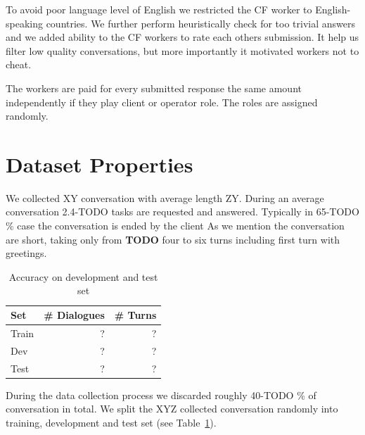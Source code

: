 \documentclass[runningheads,a4paper]{llncs}
\begin{document}
To avoid poor language level of English we restricted the CF worker to English-speaking countries.
We further perform heuristically check for too trivial answers and we added ability to the CF workers to rate each others submission.
It help us filter low quality conversations, but more importantly it motivated workers not to cheat.

The workers are paid for every submitted response the same amount independently if they play client or operator role.
The roles are assigned randomly.



\section{Dataset Properties}
\label{sec:props}

We collected XY conversation with average length ZY.
During an average conversation 2.4-TODO tasks are requested and answered.
Typically in 65-TODO \% case the conversation is ended by the client
As we mention the conversation are short, taking only from {\bf TODO} four to six turns including first turn with greetings.
\begin{table}
\begin{center}
\begin{tabular}{lrr}
\hline
Set   & \# Dialogues & \# Turns \\
\hline
Train  &   ? & ? \\
Dev &   ? & ? \\
Test &   ? & ? \\
\hline
\end{tabular}
\caption{Accuracy on development and test set}
\vspace{-2em}
\end{center}
\label{tab:props}
\end{table}

During the data collection process we discarded roughly 40-TODO \% of conversation in total.
We split the XYZ collected conversation randomly into training, development and test set (see Table~\ref{tab:props}).
\end{document}
